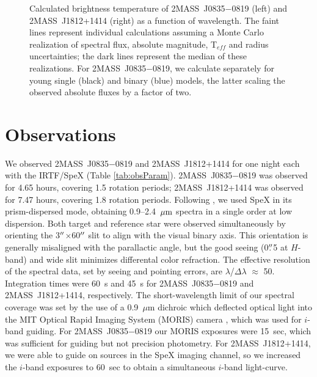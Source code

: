 \documentclass[twocolumn]{aastex6}
\newcommand{\teff}{T$_{eff}$}
\newcommand{\sha}{2MASS~J0835$-$0819}
\newcommand{\shb}{2MASS~J1812+1414}
\begin{document}
\begin{figure}
\centering
	\caption{Calculated brightness temperature of {\sha} (left) and {\shb} (right) as a function of wavelength. The faint lines represent individual calculations assuming a Monte Carlo realization of spectral flux, absolute magnitude, {\teff} and radius uncertainties; the dark lines represent the median of these realizations. For {\sha}, we calculate separately for young single (black) and binary (blue) models, the latter scaling the observed absolute fluxes by a factor of two. }
	\label{fig:tbright}
	\vspace{0.1in}
\end{figure} 

\section{Observations}\label{sec:obs}

We observed {\sha} and {\shb} for one night each with the IRTF/SpeX (Table \ref{tab:obsParam}).
{\sha} was observed for 4.65 hours, covering 1.5 rotation periods; {\shb} was observed for 7.47 hours, covering 1.8 rotation periods.
Following \citet{2014ApJ...783....5S}, we used SpeX in its prism-dispersed mode, obtaining 0.9--2.4~$\mbox{$\mu$m}$ spectra in a single order at low dispersion. 
Both target and reference star were observed simultaneously by orienting the 3$\mbox{$^{\prime\prime}$}$$\times$60$\mbox{$^{\prime\prime}$}$ slit to align with the visual binary axis. This orientation is generally misaligned with the parallactic angle, but the good seeing (0$\mbox{$.\!\!^{\prime\prime}$}$5 at $H$-band) and wide slit minimizes differental color refraction. The effective resolution of the spectral data, set by seeing and pointing errors, are $\lambda$/$\Delta\lambda$ $\approx$ 50. Integration times were 60~s and 45~s for {\sha} and {\shb}, respectively. The short-wavelength limit of our spectral coverage was set by the use of a 0.9~$\mu$m dichroic which deflected optical light into the MIT Optical Rapid Imaging System (MORIS) camera \citep{2011PASP..123..461G}, which was used for $i$-band guiding.
For {\sha} our MORIS exposures were 15~sec, which was sufficient for guiding but not precision photometry. For {\shb}, we were able to guide on sources in the SpeX imaging channel, so we increased the $i$-band exposures to 60~sec to obtain a simultaneous $i$-band light-curve.
\end{document}
